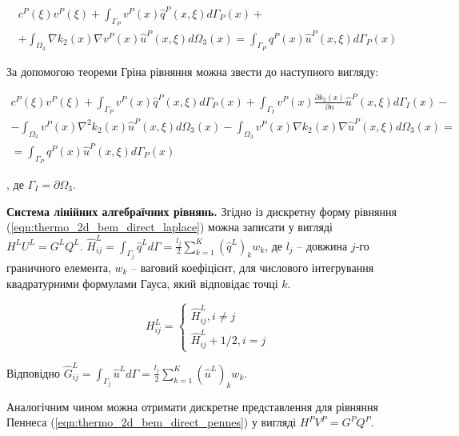 \begin{equation*}
    \begin{split}
    c^P(\xi)v^P(\xi) + \int_{\Gamma_P}v^P(x)\hat{q}^P(x,\xi)d\Gamma_P(x) + \\ 
        + \int_{\Omega_3} \nabla{k_2(x)}\nabla{v^P(x)} \hat{u}^P(x,\xi) d \Omega_3(x) = 
        \int_{\Gamma_P}q^P(x)\hat{u}^P(x,\xi)d\Gamma_P(x)
    \end{split}
\end{equation*}

За допомогою теореми Гріна рівняння можна звести до наступного вигляду:

\begin{equation}
    \label{eqn:thermo_2d_bem_direct_pennes}
    \begin{split}
    c^P(\xi)v^P(\xi) + \int_{\Gamma_P}v^P(x)\hat{q}^P(x,\xi)d\Gamma_P(x) 
        +  \int_{\Gamma_I} v^P(x) \frac{\partial{k_2(x)}}{\partial{n}} \hat{u}^P(x,\xi) d \Gamma_I(x) - \\
        - \int_{\Omega_3}v^P(x) \nabla^2 k_2(x) \hat{u}^P(x,\xi) d\Omega_3(x) 
        - \int_{\Omega_3}v^P(x) \nabla k_2(x) \nabla \hat{u}^P(x,\xi) d\Omega_3(x) = \\
        = \int_{\Gamma_P}q^P(x)\hat{u}^P(x,\xi)d\Gamma_P(x)
    \end{split}
\end{equation}

\noindent, де $\Gamma_I = \partial \Omega_3$.

\textbf{Система лінійних алгебраїчних рівнянь.} Згідно із \cite{brebbia-bem} дискретну форму рівняння 
(\ref{eqn:thermo_2d_bem_direct_laplace}) можна записати у вигляді 
$H^LU^L=G^LQ^L$. $\hat{H}_{ij}^L=\int_{\Gamma_j} \hat{q}^L d \Gamma = \frac{l_j}{2} \sum_{k=1}^{K} (\hat{q}^L)_k w_k $,
де $l_j$ -- довжина $j$-го граничного елемента, $w_k$ -- ваговий коефіцієнт, для числового інтегрування квадратурними 
формулами Гауса, який відповідає точці $k$. 

$$H_{ij}^L=\begin{cases}
\hat{H}_{ij}^L, i \neq j \\
\hat{H}_{ij}^L + 1/2, i = j
\end{cases}
$$

\noindent Відповідно $\hat{G}_{ij}^L=\int_{\Gamma_j} \hat{u}^L d \Gamma = \frac{l_j}{2} 
\sum_{k=1}^{K} (\hat{u}^L)_k w_k$.

Аналогічним чином можна отримати дискретне представлення для рівняння Пеннеса (\ref{eqn:thermo_2d_bem_direct_pennes}) у 
вигляді $H^P V^P = G^P Q^P$.

